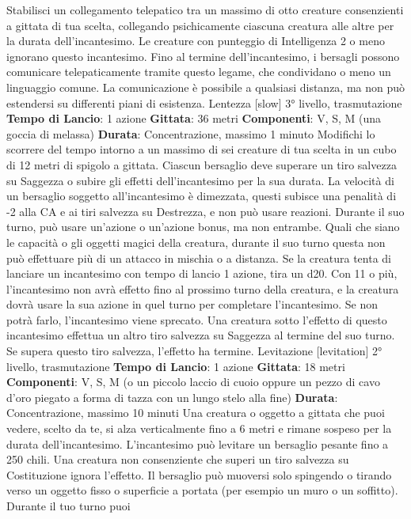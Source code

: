 \begin{multicols}{2}
Stabilisci un collegamento telepatico tra un massimo di
otto creature consenzienti a gittata di tua scelta,
collegando psichicamente ciascuna creatura alle altre
per la durata dell’incantesimo. Le creature con
punteggio di Intelligenza 2 o meno ignorano questo
incantesimo.
Fino al termine dell’incantesimo, i bersagli possono
comunicare telepaticamente tramite questo legame,
che condividano o meno un linguaggio comune. La
comunicazione è possibile a qualsiasi distanza, ma non
può estendersi su differenti piani di esistenza.
Lentezza
[slow]
3° livello, trasmutazione
\textbf{Tempo di Lancio}: 1 azione
\textbf{Gittata}: 36 metri
\textbf{Componenti}: V, S, M (una goccia di melassa)
\textbf{Durata}: Concentrazione, massimo 1 minuto
Modifichi lo scorrere del tempo intorno a un massimo di
sei creature di tua scelta in un cubo di 12 metri di
spigolo a gittata. Ciascun bersaglio deve superare un
tiro salvezza su Saggezza o subire gli effetti
dell’incantesimo per la sua durata.
La velocità di un bersaglio soggetto all’incantesimo è
dimezzata, questi subisce una penalità di -2 alla CA e ai
tiri salvezza su Destrezza, e non può usare reazioni.
Durante il suo turno, può usare un’azione o un’azione
bonus, ma non entrambe. Quali che siano le capacità o
gli oggetti magici della creatura, durante il suo turno
questa non può effettuare più di un attacco in mischia o
a distanza.
Se la creatura tenta di lanciare un incantesimo con
tempo di lancio 1 azione, tira un d20. Con 11 o più,
l’incantesimo non avrà effetto fino al prossimo turno
della creatura, e la creatura dovrà usare la sua azione
in quel turno per completare l’incantesimo. Se non potrà
farlo, l’incantesimo viene sprecato.
Una creatura sotto l’effetto di questo incantesimo
effettua un altro tiro salvezza su Saggezza al termine
del suo turno. Se supera questo tiro salvezza, l’effetto
ha termine.
Levitazione
[levitation]
2° livello, trasmutazione
\textbf{Tempo di Lancio}: 1 azione
\textbf{Gittata}: 18 metri
\textbf{Componenti}: V, S, M (o un piccolo laccio di cuoio
oppure un pezzo di cavo d’oro piegato a forma di tazza
con un lungo stelo alla fine)
\textbf{Durata}: Concentrazione, massimo 10 minuti
Una creatura o oggetto a gittata che puoi vedere, scelto
da te, si alza verticalmente fino a 6 metri e rimane
sospeso per la durata dell’incantesimo. L’incantesimo
può levitare un bersaglio pesante fino a 250 chili. Una
creatura non consenziente che superi un tiro salvezza
su Costituzione ignora l’effetto.
Il bersaglio può muoversi solo spingendo o tirando
verso un oggetto fisso o superficie a portata (per
esempio un muro o un soffitto). Durante il tuo turno puoi

\end{multicols}
